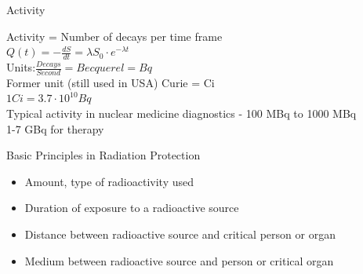 \begin{frame}{Activity}
    \begin{center}
        Activity = Number of decays per time frame\\
        \bigskip
        {\LARGE
            $Q(t)=-\frac{dS}{dt}=\lambda S_0 \cdot e^{-\lambda t}$\\%
        }
        \bigskip
        Units:$ \frac{Decays}{Second} = Becquerel = Bq$\\
        \bigskip
        Former unit (still used in USA) Curie = Ci\\
        $1 Ci = 3.7 \cdot 10^{10}Bq$\\
        \bigskip
        Typical activity in nuclear medicine diagnostics - 100 MBq to 1000 MBq \\
        1-7 GBq for therapy
    \end{center}
\end{frame}

\begin{frame}[c]{Basic Principles in Radiation Protection}

    \begin{center}
        \begin{itemize}
            \setlength\itemsep{0.4cm}
            \item \textbf{\large \color{faublue}{Activity}}

                  Amount, type of radioactivity used

            \item \textbf{\large \color{faublue}{Time}}

                  Duration of exposure to a radioactive source

            \item \textbf{\large \color{faublue}{Distance}}

                  Distance between radioactive source and critical person or organ
            \item \textbf{\large \color{faublue}{Shielding}}

                  Medium between radioactive source and person or critical organ
        \end{itemize}
    \end{center}

\end{frame}

